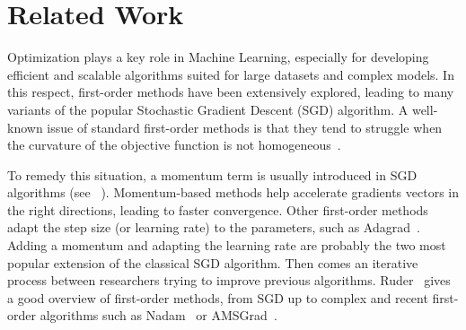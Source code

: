 \documentclass[conference]{IEEEtran}
\begin{document}


\section{Related Work}
\label{sec:rel_work}

Optimization plays a key role in Machine Learning, especially for developing efficient and scalable algorithms suited for large datasets and complex models. In this respect, first-order methods have been extensively explored, leading to many variants of the popular Stochastic Gradient Descent (SGD) algorithm. A well-known issue of standard first-order methods is that they tend to struggle when the curvature of the objective function is not homogeneous~\cite{sutton_two_1986}. 

 To remedy this situation, a momentum term is usually introduced in SGD algorithms (see ~\cite{qian_momentum_1999}). Momentum-based methods help accelerate gradients vectors in the right directions, leading to faster convergence. Other first-order methods adapt the step size (or learning rate) to the parameters, such as Adagrad~\cite{duchi_adaptive_2011}. Adding a momentum and adapting the learning rate are probably the two most popular extension of the classical SGD algorithm. Then comes an iterative process between researchers trying to improve previous algorithms. Ruder~\cite{ruder_overview_2016} gives a good overview of first-order methods, from SGD up to complex and recent first-order algorithms such as Nadam~\cite{dozat_incorporating_2016} or AMSGrad~\cite{reddi_convergence_2018}. 
\end{document}
